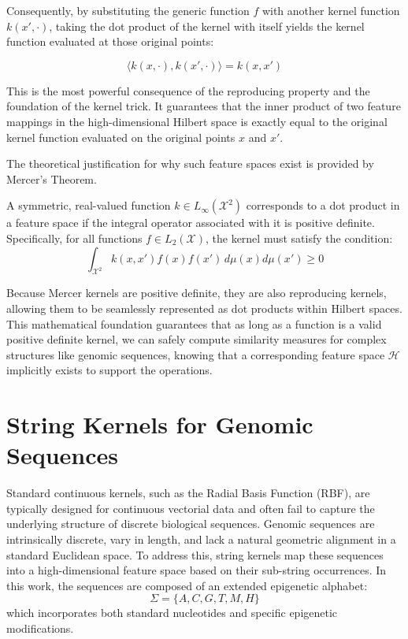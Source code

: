 Consequently, by substituting the generic function $f$ with another kernel function $k(x', \cdot)$, taking the dot product of the kernel with itself yields the kernel function evaluated at those original points:

\begin{equation}\label{eq:kernel-dot}
\langle k(x, \cdot), k(x', \cdot) \rangle = k(x, x')
\end{equation}

This is the most powerful consequence of the reproducing property and the foundation of the kernel trick. 
It guarantees that the inner product of two feature mappings in the high-dimensional Hilbert space is exactly equal to the original kernel function evaluated on the original points $x$ and $x'$. 

The theoretical justification for why such feature spaces exist is provided by Mercer's Theorem. 
\begin{teorema}\label{thm:mercer}
A symmetric, real-valued function $k \in L_{\infty}(\mathcal{X}^2)$ corresponds to a dot product in a feature space if the integral operator associated with it is positive definite. Specifically, for all functions $f \in L_2(\mathcal{X})$, the kernel must satisfy the condition:
\begin{equation}\label{eq:mercer-condition}
\int_{\mathcal{X}^2} k(x, x') f(x) f(x') \, d\mu(x) d\mu(x') \geq 0
\end{equation}
\end{teorema}

Because Mercer kernels are positive definite, they are also reproducing kernels, allowing them to be seamlessly represented as dot products within Hilbert spaces. This mathematical foundation guarantees that as long as a function is a valid positive definite kernel, we can safely compute similarity measures for complex structures like genomic sequences, knowing that a corresponding feature space $\mathcal{H}$ implicitly exists to support the operations.

\section{String Kernels for Genomic Sequences}\label{sec:string-kernels}

Standard continuous kernels, such as the Radial Basis Function (RBF), are typically designed for continuous vectorial data and often fail to capture the underlying structure of discrete biological sequences. Genomic sequences are intrinsically discrete, vary in length, and lack a natural geometric alignment in a standard Euclidean space. To address this, string kernels map these sequences into a high-dimensional feature space based on their sub-string occurrences. In this work, the sequences are composed of an extended epigenetic alphabet:
\begin{equation}\label{eq:alphabet}
\Sigma = \{A, C, G, T, M, H\}
\end{equation}
which incorporates both standard nucleotides and specific epigenetic modifications.

